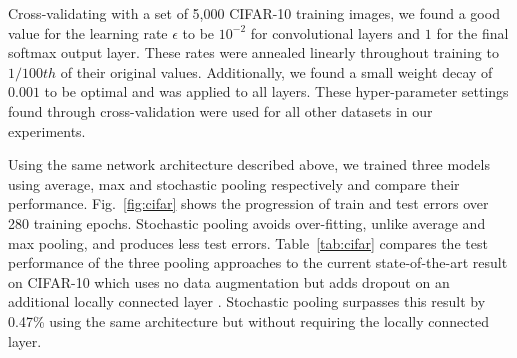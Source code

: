 \documentclass{article} %
\newcommand{\fig}[1]{Fig.~\ref{fig:#1}}
\newcommand{\tab}[1]{Table~\ref{tab:#1}}
\begin{document}
Cross-validating with a set of 5,000 CIFAR-10 training images, we
found a good value for the learning rate $\epsilon$ to be
$10^{-2}$ for convolutional layers and $1$ for the final softmax
output layer. These rates were annealed linearly throughout training
to $1/100th$ of their original values.
Additionally, we found a small weight decay of $0.001$ to be optimal
and was applied to all layers. These hyper-parameter settings found through cross-validation were
used for all other datasets in our experiments.

Using the same network architecture described above, we trained
three models using average, max and stochastic pooling respectively and compare
their performance. \fig{cifar} shows the progression of train and test
errors over 280 training epochs. Stochastic pooling avoids
over-fitting, unlike average and max pooling, and produces less test
errors. \tab{cifar} compares the test performance of the three pooling
approaches to the current state-of-the-art result on CIFAR-10 which uses no data augmentation but
adds dropout on an additional locally connected layer
\cite{Hinton12}. Stochastic pooling surpasses this
result by 0.47\% using the same architecture but without requiring the
locally connected layer.



\end{document}
